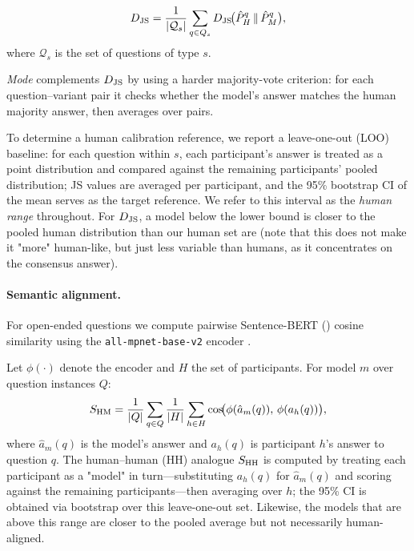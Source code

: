 \documentclass[letterpaper]{article}
\begin{document}
\begin{equation}
  \djs = \frac{1}{|\mathcal{Q}_s|}\sum_{q\in Q_s}\djs\!\bigl(\hat{P}_{H}^{q} \,\|\, \hat{P}_{M}^{q}\bigr),
  \label{eq:js}
\end{equation}
where $\mathcal{Q}_s$ is the set of questions of type $s$.

\textit{Mode} complements $\djs$ by using a harder majority-vote criterion: for each question--variant pair it checks whether the model's answer matches the human majority answer, then averages over pairs.

To determine a human calibration reference, we report a leave-one-out (LOO) baseline: for each question within $s$, each participant's answer is treated as a point distribution and compared against the remaining participants' pooled distribution; JS values are averaged per participant, and the 95\% bootstrap CI of the mean serves as the target reference.
We refer to this interval as the \textit{human range} throughout.
For $\djs$, a model below the lower bound is closer to the pooled human distribution than our human set are (note that this does not make it "more" human-like, but just less variable than humans, as it concentrates on the consensus answer). %

\paragraph{Semantic alignment.} For open-ended questions we compute pairwise Sentence-BERT (\citealt{reimers2019sentence}) cosine similarity using the \texttt{all-mpnet-base-v2} encoder \citep{reimers2019sentence}. %

Let $\phi(\cdot)$ denote the encoder and $H$ the set of participants.
For model $m$ over question instances $Q$:
\begin{equation}
  \sHM = \frac{1}{|Q|}\sum_{q\in Q}\frac{1}{|H|}\sum_{h\in H}\cos\!\bigl(\phi(\hat{a}_{m}(q)),\,\phi(a_{h}(q))\bigr),
  \label{eq:sbert}
\end{equation}
where $\hat{a}_{m}(q)$ is the model's answer and $a_{h}(q)$ is participant $h$'s answer to question $q$.
The human--human (HH) analogue $\sHH$ is computed by treating each participant as a "model" in turn---substituting $a_{h}(q)$ for $\hat{a}_{m}(q)$ and scoring against the remaining participants---then averaging over $h$; the 95\% CI is obtained via bootstrap over this leave-one-out set. Likewise, the models that are above this range are closer to the pooled average but not necessarily human-aligned. 
\end{document}

